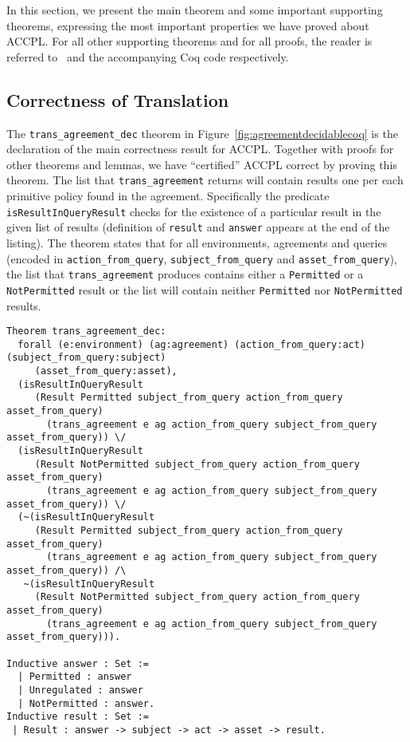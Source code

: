 \documentclass[conference]{IEEEtran}
\newcommand{\syn}{\texttt}
\begin{document}
In this section, we present the main theorem and some important supporting theorems, expressing the most important
properties we have proved about ACCPL. For all other supporting theorems and
for all proofs, the reader is referred to~\cite{BahPhd} and the accompanying Coq code respectively.

\subsection{Correctness of Translation}\label{sec:correct}

The \syn{trans_agreement_dec} theorem in Figure~\ref{fig:agreementdecidablecoq} is the declaration of the main correctness result for \ac{ACCPL}. Together with proofs for other theorems and lemmas, we have ``certified'' \ac{ACCPL} correct by proving this theorem. The list that \syn{trans_agreement} returns will contain results one per each primitive policy found in the agreement. Specifically the predicate \syn{isResultInQueryResult} checks for the existence of a particular result in the given list of results (definition of \syn{result} and \syn{answer} appears at the end of the listing). The theorem states that for all environments, agreements and queries (encoded in \syn{action_from_query}, \syn{subject_from_query} and \syn{asset_from_query}), the list that \syn{trans_agreement} produces contains either a \syn{Permitted} or a \syn{NotPermitted} result or the list will contain neither \syn{Permitted} nor \syn{NotPermitted} results.

\lstset{language=Coq, captionpos=b}
\begin{figure*}
\begin{lstlisting}
Theorem trans_agreement_dec:
  forall (e:environment) (ag:agreement) (action_from_query:act) (subject_from_query:subject)
     (asset_from_query:asset),
  (isResultInQueryResult 
     (Result Permitted subject_from_query action_from_query asset_from_query)
       (trans_agreement e ag action_from_query subject_from_query asset_from_query)) \/
  (isResultInQueryResult 
     (Result NotPermitted subject_from_query action_from_query asset_from_query)
       (trans_agreement e ag action_from_query subject_from_query asset_from_query)) \/
  (~(isResultInQueryResult 
     (Result Permitted subject_from_query action_from_query asset_from_query)
       (trans_agreement e ag action_from_query subject_from_query asset_from_query)) /\
   ~(isResultInQueryResult 
     (Result NotPermitted subject_from_query action_from_query asset_from_query)
       (trans_agreement e ag action_from_query subject_from_query asset_from_query))).

Inductive answer : Set := 
  | Permitted : answer 
  | Unregulated : answer
  | NotPermitted : answer.
Inductive result : Set := 
 | Result : answer -> subject -> act -> asset -> result.    
\end{lstlisting}
\caption{Agreement Translation's Correctness Property}
\label{fig:agreementdecidablecoq}
\end{figure*}
\end{document}
